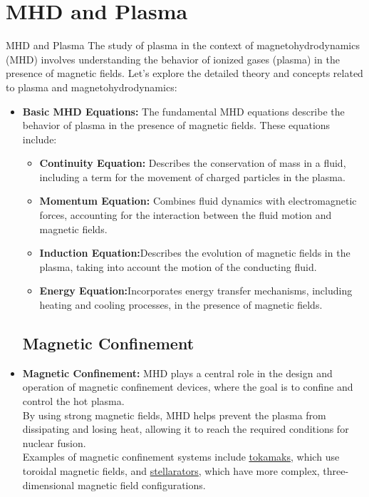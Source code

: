 \documentclass[13pt]{beamer}
\begin{document}
\section{MHD and Plasma}
\begin{frame}[t,allowframebreaks]{MHD and Plasma}
	The study of plasma in the context of magnetohydrodynamics (MHD) involves understanding the behavior of ionized gases (plasma) in the presence of magnetic fields. Let's explore the detailed theory and concepts related to plasma and magnetohydrodynamics: \\
	\vspace{0.5cm}
	\begin{itemize}
		\subsection{Basic MHD Equations}
		\item \textbf{Basic MHD Equations:} The fundamental MHD equations describe the behavior of plasma in the presence of magnetic fields. These equations include:
		\begin{itemize}
			\vspace{0.2cm}
			\item \textbf{Continuity Equation:} Describes the conservation of mass in a fluid, including a term for the movement of charged particles in the plasma.

		\item	\textbf{Momentum Equation:} Combines fluid dynamics with electromagnetic forces, accounting for the interaction between the fluid motion and magnetic fields.

		\item	\textbf{	Induction Equation:}Describes the evolution of magnetic fields in the plasma, taking into account the motion of the conducting fluid.

		\item	\textbf{	Energy Equation:}Incorporates energy transfer mechanisms, including heating and cooling processes, in the presence of magnetic fields.

		\end{itemize}

		\subsection{Magnetic Confinement}
		\item	\textbf{Magnetic Confinement:} MHD plays a central role in the design and operation of magnetic confinement devices, where the goal is to confine and \framebreak control the hot plasma. \\
		By using strong magnetic fields, MHD helps prevent the
		 plasma from dissipating and losing heat, allowing it to reach the required conditions for nuclear fusion. \\
		Examples of magnetic confinement systems include
				\href{https://en.wikipedia.org/wiki/Tokamak}{\underline{tokamaks}}, which use toroidal magnetic fields, and \href{https://en.wikipedia.org/wiki/Stellarator}{\underline{stellarators}}, which have more complex, three-dimensional magnetic field configurations.



\end{itemize}
\end{frame}
\end{document}
